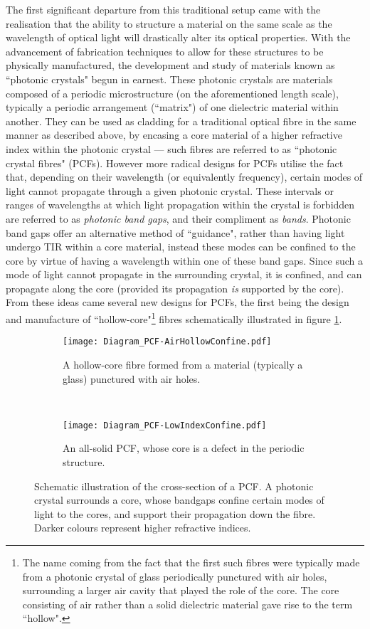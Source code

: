 The first significant departure from this traditional setup came with the realisation that the ability to 
structure a material on the same scale as the wavelength of optical light will drastically alter its optical properties.
With the advancement of fabrication techniques to allow for these structures to be physically manufactured, the development and study of materials known as ``photonic crystals" begun in earnest.
These photonic crystals are materials composed of a periodic microstructure (on the aforementioned length scale), typically a periodic arrangement (``matrix") of one dielectric material within another.
They can be used as cladding for a traditional optical fibre in the same manner as described above, by encasing a core material of a higher refractive index within the photonic crystal --- such fibres are referred to as ``photonic crystal fibres" (PCFs).
However more radical designs for PCFs utilise the fact that, depending on their wavelength (or equivalently frequency), certain modes of light cannot propagate through a given photonic crystal.
These intervals or ranges of wavelengths at which light propagation within the crystal is forbidden are referred to as \emph{photonic band gaps}, and their compliment as \emph{bands}.
Photonic band gaps offer an alternative method of ``guidance", rather than having light undergo TIR within a core material, instead these modes can be confined to the core by virtue of having a wavelength within one of these band gaps.
Since such a mode of light cannot propagate in the surrounding crystal, it is confined, and can propagate along the core (provided its propagation \emph{is} supported by the core).
From these ideas came several new designs for PCFs, the first being the design and manufacture of ``hollow-core"\footnote{The name coming from the fact that the first such fibres were typically made from a photonic crystal of glass periodically punctured with air holes, surrounding a larger air cavity that played the role of the core. The core consisting of air rather than a solid dielectric material gave rise to the term ``hollow".} fibres schematically illustrated in figure \ref{fig:Diagram_PCF-AirHollowConfine.pdf}.
\begin{figure}[b!]
	\centering
	\begin{subfigure}[t]{0.45\textwidth}
		\centering
		\texttt{[image: Diagram\_PCF-AirHollowConfine.pdf]}
		\caption{\label{fig:Diagram_PCF-AirHollowConfine.pdf} A hollow-core fibre formed from a material (typically a glass) punctured with air holes.}
	\end{subfigure}
	~
	\begin{subfigure}[t]{0.45\textwidth}
		\centering
		\texttt{[image: Diagram\_PCF-LowIndexConfine.pdf]}
		\caption{\label{fig:Diagram_PCF-LowIndexConfine.pdf} An all-solid PCF, whose core is a defect in the periodic structure.}
	\end{subfigure}
	\caption{\label{fig:Diagram_PCF} Schematic illustration of the cross-section of a PCF. A photonic crystal surrounds a core, whose bandgaps confine certain modes of light to the cores, and support their propagation down the fibre. Darker colours represent higher refractive indices.}
\end{figure}
